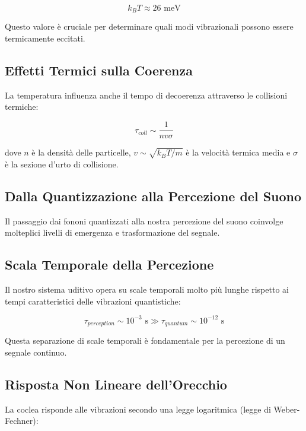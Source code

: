 \documentclass[a4paper,11pt]{article}
\begin{document}
\begin{equation}
k_BT \approx 26 \text{ meV}
\end{equation}


Questo valore è cruciale per determinare quali modi vibrazionali possono
essere termicamente eccitati.

\subsection{Effetti Termici sulla Coerenza}

La temperatura influenza anche il tempo di decoerenza attraverso le
collisioni termiche:

\begin{equation}
\tau_{coll} \sim \frac{1}{nv\sigma}
\end{equation}


dove $n$ è la densità delle particelle, $v \sim \sqrt{k_BT/m}$ è la
velocità termica media e $\sigma$ è la sezione d'urto di collisione.

\subsection{Dalla Quantizzazione alla Percezione del Suono}

Il passaggio dai fononi quantizzati alla nostra percezione del suono
coinvolge molteplici livelli di emergenza e trasformazione del segnale.

\subsection{Scala Temporale della Percezione}

Il nostro sistema uditivo opera su scale temporali molto più lunghe
rispetto ai tempi caratteristici delle vibrazioni quantistiche:

\begin{equation}
\tau_{perception} \sim 10^{-3} \text{ s} \gg \tau_{quantum} \sim 10^{-12} \text{ s}
\end{equation}


Questa separazione di scale temporali è fondamentale per la percezione
di un segnale continuo.

\subsection{Risposta Non Lineare dell'Orecchio}

La coclea risponde alle vibrazioni secondo una legge logaritmica (legge
di Weber-Fechner):
\end{document}
